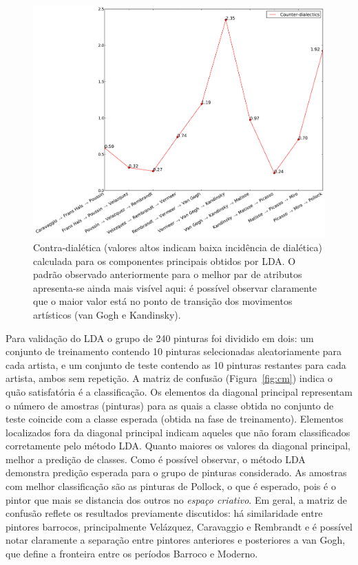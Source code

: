 \begin{figure}[h!]
\begin{center}
        \includegraphics[width=\columnwidth]{figs/caso3_dialetica}
      \caption{Contra-dialética (valores altos indicam baixa
        incidência de dialética) calculada para os componentes principais
        obtidos por LDA. O padrão observado anteriormente para o melhor par de
        atributos apresenta-se ainda mais visível aqui: é possível observar
        claramente que o maior valor está no ponto de transição dos movimentos
        artísticos (van Gogh e Kandinsky).}
        \label{fig:caso3_dialetica}
\end{center}
\end{figure}

Para validação do LDA o grupo de 240 pinturas foi dividido em dois: um
conjunto de treinamento contendo 10 pinturas selecionadas
aleatoriamente para cada artista, e um conjunto de teste contendo as
10 pinturas restantes para cada artista, ambos sem repetição. A matriz
de confusão (Figura~\ref{fig:cm}) indica o quão satisfatória é a
classificação. Os elementos da diagonal principal representam o número
de amostras (pinturas) para as quais a classe obtida no conjunto de
teste coincide com a classe esperada (obtida na fase de
treinamento). Elementos localizados fora da diagonal principal indicam
aqueles que não foram classificados corretamente pelo método
LDA. Quanto maiores os valores da diagonal principal, melhor a
predição de classes. Como é possível observar, o método LDA demonstra
predição esperada para o grupo de pinturas considerado. As amostras
com melhor classificação são as pinturas de Pollock, o que é esperado,
pois é o pintor que mais se distancia dos outros no \textit{espaço
  criativo}. Em geral, a matriz de confusão reflete os resultados
previamente discutidos: há similaridade entre pintores barrocos,
principalmente Velázquez, Caravaggio e Rembrandt e é possível notar
claramente a separação entre pintores anteriores e posteriores a van
Gogh, que define a fronteira entre os períodos Barroco e Moderno.

